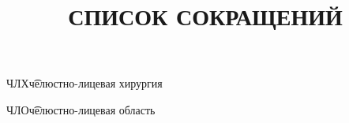 
\title{
СПИСОК СОКРАЩЕНИЙ
}

\item ЧЛХ\t челюстно-лицевая хирургия 
\item ЧЛО\t челюстно-лицевая область 
